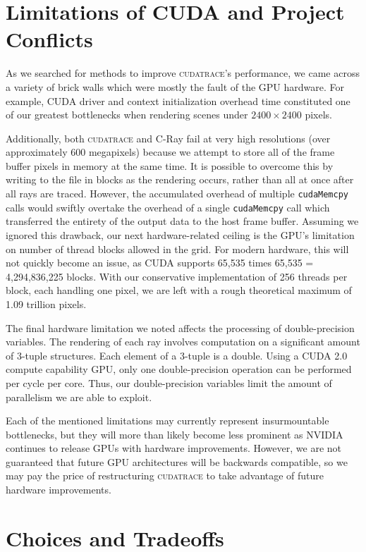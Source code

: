 \documentclass[12pt]{article}
\begin{document}
\section{Limitations of CUDA and Project Conflicts}

As we searched for methods to improve \textsc{cudatrace}'s performance, we came across a variety of brick walls which were mostly the fault of the GPU hardware. For example, CUDA driver and context initialization overhead time constituted one of our greatest bottlenecks when rendering scenes under $2400 \times 2400$ pixels. 

Additionally, both \textsc{cudatrace} and C-Ray fail at very high resolutions (over approximately 600 megapixels) because we attempt to store all of the frame buffer pixels in memory at the same time. It is possible to overcome this by writing to the file in blocks as the rendering occurs, rather than all at once after all rays are traced. However, the accumulated overhead of multiple \texttt{cudaMemcpy} calls would swiftly overtake the overhead of a single \texttt{cudaMemcpy} call which transferred the entirety of the output data to the host frame buffer. Assuming we ignored this drawback, our next hardware-related ceiling is the GPU's limitation on number of thread blocks allowed in the grid. For modern hardware, this will not quickly become an issue, as CUDA  supports 65,535 times 65,535 = 4,294,836,225 blocks. With our conservative implementation of 256 threads per block, each handling one pixel, we are left with a rough theoretical maximum of 1.09 trillion pixels. 

The final hardware limitation we noted affects the processing of double-precision variables. The rendering of each ray involves computation on a significant amount of 3-tuple structures. Each element of a 3-tuple is a double.  Using a CUDA 2.0 compute capability GPU, only one double-precision operation can be performed per cycle per core. Thus, our double-precision variables limit the amount of parallelism we are able to exploit.

Each of the mentioned limitations may currently represent insurmountable bottlenecks, but they will more than likely become less prominent as NVIDIA continues to release GPUs with hardware improvements. However, we are not guaranteed that future GPU architectures will be backwards compatible, so we may pay the price of restructuring \textsc{cudatrace} to take advantage of future hardware improvements.

\section{Choices and Tradeoffs}
\end{document}
